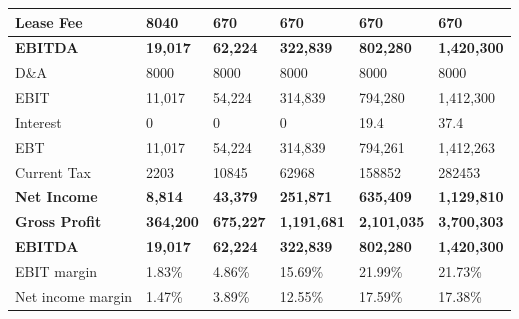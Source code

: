 \begin{tabular}{llllll}
 Lease Fee                        & 8040            & 670               & 670               & 670               & 670               \\
 \hline \textbf{EBITDA}             & \textbf{19,017}  & \textbf{62,224}    & \textbf{322,839}   & \textbf{802,280}   & \textbf{1,420,300} \\
 D\&A                              & 8000            & 8000              & 8000              & 8000              & 8000              \\
 EBIT                             & 11,017          & 54,224            & 314,839           & 794,280           & 1,412,300         \\
 Interest                         & 0               & 0                 & 0                 & 19.4              & 37.4              \\
 EBT                              & 11,017          & 54,224            & 314,839           & 794,261           & 1,412,263         \\
 Current Tax                      & 2203            & 10845             & 62968             & 158852            & 282453            \\
 \hline \textbf{Net Income}         & \textbf{8,814}   & \textbf{43,379}    & \textbf{251,871}   & \textbf{635,409}   & \textbf{1,129,810} \\
 \hline \textbf{Gross Profit}       & \textbf{364,200} & \textbf{675,227}   & \textbf{1,191,681} & \textbf{2,101,035} & \textbf{3,700,303} \\
 \hline \textbf{EBITDA}             & \textbf{19,017}  & \textbf{62,224}    & \textbf{322,839}   & \textbf{802,280}   & \textbf{1,420,300} \\
 EBIT margin                      & 1.83\%           & 4.86\%             & 15.69\%            & 21.99\%            & 21.73\%            \\
 Net income margin                & 1.47\%           & 3.89\%             & 12.55\%            & 17.59\%            & 17.38\%            \\
\hline
\end{tabular}